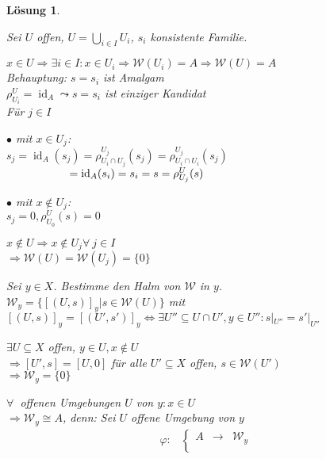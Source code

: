 \documentclass[paper = A4, fontsize=12pt, numbers=noendperiod, chapterprefix=true]{scrbook}
\theoremstyle{break}
\newtheorem{Loes}{L\"osung}
\theoremstyle{nonumberbreak}
\theoremstyle{nonumberplain}
\DeclareMathOperator{\id}{id}
\newcommand{\calW}{\mathcal{W}}
\begin{document}
\begin{Loes}\begin{enumerate}[a)]
\item
  Sei $U$ offen, $U = \bigcup\limits_{i\in I} U_i$, $s_i$ konsistente Familie.
  \begin{description}[\setlabelstyle{\itshape}]
  \item[Fall 1:]
    $x \in U \Rightarrow \exists i \in I: x\in U_i \Rightarrow \calW(U_i) = A \Rightarrow  \calW(U) = A$\\
    \emph{Behauptung:} $s=s_i$ ist Amalgam\\
    $\rho_{U_i}^U= \id_A \leadsto s = s_i$ ist einziger Kandidat\\
    F\"ur $j\in I$\begin{description}
    \item{$\bullet$ mit $x\in U_j$:}\\
      $s_j = \id_A(s_j) = \rho_{U_i\cap U_j}^{U_j}(s_j) = \rho_{U_i\cap U_i}^{U_j}(s_j)$\\
      $\textcolor{white}{s_j = \id_A(s_j)}= \id_A(s_i) = s_i = s = \rho_{U_j}^U(s)$
    \item{$\bullet$ mit $x\notin U_j$:}\\
      $s_j = 0, \rho_{U_0}^U(s) = 0$
    \end{description}
  \item[Fall 2:]
    $x \notin U \Rightarrow x\notin U_j \forall\  j \in I$\\
    $\Rightarrow \calW(U) = \calW(U_j) = \{0\}$
  \end{description}
\item
  Sei $y \in X$. Bestimme den Halm von $\calW$ in $y$.\\
  $\calW_y = \{[(U,s)]_y \vert s\in \calW(U)\}$ mit $[(U,s)]_y = [(U',s')]_y \Leftrightarrow \exists U'' \subseteq U \cap U', y \in U'': s|_{U''} = s'|_{U''}$ \begin{description}[\setlabelstyle{\itshape}]
  \item[Fall 1:]$\exists U\subseteq X$ offen, $y\in U, x\notin U$\\
    $\Rightarrow [U',s] = [U,0]$ f\"ur alle $U'\subseteq X$ offen, $s\in \calW(U')$\\
    $\Rightarrow \calW_y = \{0\}$
  \item[Fall 2:] $\forall\ $ offenen Umgebungen $U$ von $y: x\in U$\\
    $\Rightarrow \calW_y \cong A$, \emph{denn:} Sei $U$ offene Umgebung von $y$
      \begin{equation*}\begin{split} \varphi:&\left\{\begin{array}{rcl} A &\to& \calW_y \\

\end{array}
\end{split}
\end{equation*}
\end{description}
\end{enumerate}
\end{Loes}
\end{document}
